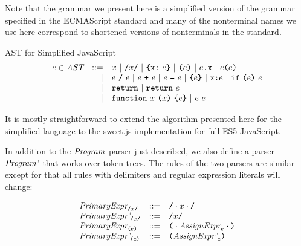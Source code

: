 \documentclass[preprint,10pt]{sigplanconf}
\begin{document}
Note that the grammar we present here is a simplified version of the
grammar specified in the ECMAScript standard \cite{International2011}
and many of the nonterminal names we use here correspond to shortened
versions of nonterminals in the standard.


\begin{displayfigure}{\label{fig:ast}AST for Simplified JavaScript}
\[
\begin{array}{rrl}
  e \in \textit{AST} &::=& x ~|~ \texttt{/}x\texttt{/} ~|~ \texttt{\{}\texttt{x}\texttt{:}~e\texttt{\}} ~|~ \texttt{(}e\texttt{)}
  ~|~ e\texttt{.}\texttt{x} ~|~ e\texttt{(}e\texttt{)}
  \\
  &|& e~\texttt{/}~e ~|~ e ~\texttt{+}~ e ~|~ e ~\texttt{=}~ e
  ~|~ \texttt{\{}e\texttt{\}} ~|~ \texttt{x} \texttt{:} e ~|~ \texttt{if}~\texttt{(}e\texttt{)}~e
  \\ 
  &|& \texttt{return} ~|~ \texttt{return}~e
  \\
  &|& \texttt{function}~x~\texttt{(}x\texttt{)}~\texttt{\{}e\texttt{\}} ~|~ e~e
\end{array}
\]
\end{displayfigure}

It is mostly straightforward to extend the algorithm
presented here for the simplified language to 
the sweet.js implementation for full ES5 JavaScript.

In addition to the \( \textit{Program}_{} \) parser just described, we
also define a parser \( \textit{Program'}_{} \) that works over token
trees. The rules of the two parsers are similar except for that
all rules with delimiters and regular expression literals will change:

\[
\begin{array}{lcl}
  \textit{PrimaryExpr}_{\texttt{/}x\texttt{/}} &::=& \texttt{/}\cdot x \cdot \texttt{/}
  \\
  \textit{PrimaryExpr'}_{\texttt{/}x\texttt{/}} &::=& \texttt{/}x\texttt{/}
  \\
  \textit{PrimaryExpr}_{\texttt{(}e\texttt{)}} &::=& 
  \texttt{(} \cdot \textit{AssignExpr}_{e} \cdot \texttt{)}
  \\
  \textit{PrimaryExpr'}_{\texttt{(}e\texttt{)}} &::=& 
  \texttt{(}\textit{AssignExpr'}_{e}\texttt{)}
  \\
\end{array}
\]
\end{document}
